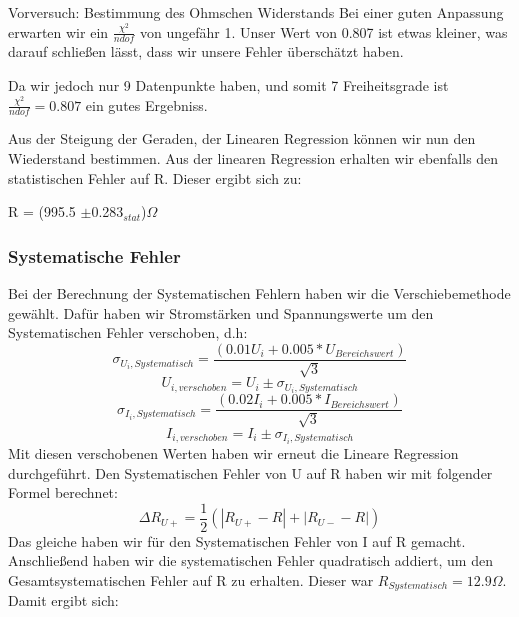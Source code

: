 \documentclass[twoside]{protokoll}
\begin{document}
\begin{aufgabe}{Vorversuch: Bestimmung des Ohmschen Widerstands}
Bei einer guten Anpassung erwarten wir ein  $\frac{\chi^2}{ndof}$ von ungefähr 1. Unser Wert von 0.807 ist etwas kleiner, was darauf schließen lässt, dass wir unsere Fehler überschätzt haben. 
 
Da wir jedoch nur 9 Datenpunkte haben, und somit 7 Freiheitsgrade ist $\frac{\chi^2}{ndof} = 0.807$ ein gutes Ergebniss. 

Aus der Steigung der Geraden, der Linearen Regression können wir nun den Wiederstand bestimmen. Aus der linearen Regression erhalten wir ebenfalls den statistischen Fehler auf R.
 Dieser ergibt sich zu:\\

{\centering R = (995.5 $\pm$0.283$_{stat}$)$\Omega$ \par} 


\subsubsection{Systematische Fehler}
Bei der Berechnung der Systematischen Fehlern haben wir die Verschiebemethode gewählt.
Dafür haben wir Stromstärken und Spannungswerte um den Systematischen Fehler verschoben, d.h:
\begin{equation}
    \sigma_{U_i,Systematisch}=\frac{(0.01U_i+ 0.005 * U_{Bereichswert})}{\sqrt{3}}
\end{equation}
\begin{equation}
    U_{i,verschoben} = U_i \pm \sigma_{U_i,Systematisch}
\end{equation}
\begin{equation}
    \sigma_{I_i,Systematisch}=\frac{(0.02I_i+ 0.005 * I_{Bereichswert})}{\sqrt{3}}
\end{equation}
\begin{equation}
    I_{i,verschoben} = I_i \pm \sigma_{I_i,Systematisch}
\end{equation}
Mit diesen verschobenen Werten haben wir erneut die Lineare Regression durchgeführt.
Den Systematischen Fehler von U auf R haben wir mit folgender Formel berechnet:
\begin{equation}
    \Delta R_{U+} = \frac{1}{2} (|R_{U+} - R| + |R_{U-} - R|)
\end{equation}
Das gleiche haben wir für den Systematischen Fehler von I auf R gemacht.
Anschließend haben wir die systematischen Fehler quadratisch addiert, um den Gesamtsystematischen Fehler auf R zu erhalten.
Dieser war $R_{Systematisch} = 12.9\Omega$. \\
 
Damit ergibt sich:

\end{aufgabe}
\end{document}
